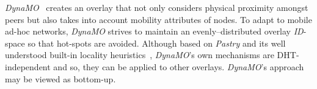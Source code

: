 % 
% 

\emph{DynaMO}~\cite{WZS2004} creates an overlay that 
not only considers physical proximity amongst peers but also
takes into account mobility attributes of nodes.
To adapt to mobile ad-hoc networks, \emph{DynaMO} strives
to maintain an evenly--distributed overlay \emph{ID}-space 
so that hot-spots are avoided. 
Although based on \emph{Pastry} and 
its well understood built-in locality heuristics~\cite{CDCR2002a},
\emph{DynaMO}'s own mechanisms are {DHT}-independent and 
so, they can be applied to other overlays.
\emph{DynaMO}'s approach may be viewed as bottom-up. 

